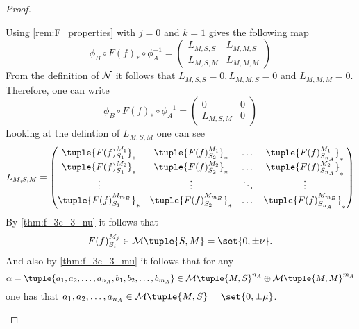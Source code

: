 \begin{proof}
\begin{enumerate}
{            Using \autoref{rem:F_properties} with \( j = 0 \) and \( k = 1 \) gives the following map
            \[
                \phi_B \circ F(f)_* \circ \phi_A^{-1} =
                \begin{pmatrix}
                    L_{M, S, S} & L_{M, M, S} \\
                    L_{M, S, M} & L_{M, M, M}
                \end{pmatrix}
            \]
            From the definition of \( {\mathcal{N}} \) it follows that \( L_{M, S, S} = 0, L_{M, M, S} = 0 \) and \( L_{M, M, M} = 0 \). Therefore, one can write
            \[
                \phi_B \circ F(f)_* \circ \phi_A^{-1} =
                \begin{pmatrix}
                    0 & 0 \\
                    L_{M, S, M} & 0
                \end{pmatrix}
            \]
            Looking at the defintion of \( L_{M, S, M} \) one can see
            \[
                L_{M, S, M} =
                \begin{pmatrix}
                    \tuple{ F(f)_{S_1}^{M_1} }_* &
                    \tuple{ F(f)_{S_2}^{M_1} }_* &
                    \dots &
                    \tuple{ F(f)_{S_{n_A}}^{M_1} }_* \\
                    \tuple{ F(f)_{S_1}^{M_2} }_* &
                    \tuple{ F(f)_{S_2}^{M_2} }_* &
                    \dots &
                    \tuple{ F(f)_{S_{n_A}}^{M_2} }_* \\
                    \vdots & \vdots & \ddots & \vdots \\
                    \tuple{ F(f)_{S_1}^{M_{m_B}} }_* &
                    \tuple{ F(f)_{S_2}^{M_{m_B}} }_* &
                    \dots &
                    \tuple{ F(f)_{S_{n_A}}^{M_{m_B}} }_* \\
                \end{pmatrix}
            \]
            By \autoref{thm:f_3c_3_nu} it follows that
            \[
                F(f)_{S_i}^{M_j} \in \Mc\tuple{S, M} = \set{0, \pm \nu}.
            \]
            And also by \autoref{thm:f_3c_3_mu} it follows that for any
            \[
                \alpha = \tuple{a_1, a_2, \dots, a_{n_A}, b_1, b_2, \dots, b_{m_A}} \in \Mc\tuple{M, S}^{n_A} \oplus \Mc\tuple{M, M}^{m_A}
            \]
            one has that \( a_1, a_2, \dots, a_{n_A} \in \Mc\tuple{M, S} = \set{ 0, \pm \mu } \).

}
\end{enumerate}
\end{proof}
